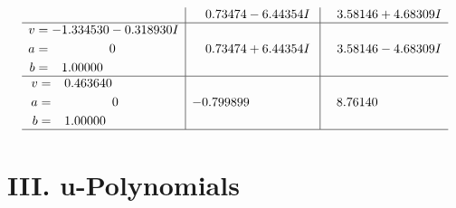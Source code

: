 \documentclass[1p]{elsarticle_modified}
\theoremstyle{definition}
\begin{document}
$$\begin{array}{c|c|c}
 & \phantom{-}0.73474 - 6.44354 I & \phantom{-}3.58146 + 4.68309 I \\ \hline\begin{aligned}
v &= -1.334530 - 0.318930 I \\
a &= \phantom{-0.000000 } 0 \\
b &= \phantom{-}1.00000\phantom{ +0.000000I}\end{aligned}
 & \phantom{-}0.73474 + 6.44354 I & \phantom{-}3.58146 - 4.68309 I \\ \hline\begin{aligned}
v &= \phantom{-}0.463640\phantom{ +0.000000I} \\
a &= \phantom{-0.000000 } 0 \\
b &= \phantom{-}1.00000\phantom{ +0.000000I}\end{aligned}
 & -0.799899\phantom{ +0.000000I} & \phantom{-}8.76140\phantom{ +0.000000I}\\
 \hline 
 \end{array}$$\newpage
\newpage\renewcommand{\arraystretch}{1}
\centering \section*{ III. u-Polynomials}
\end{document}

